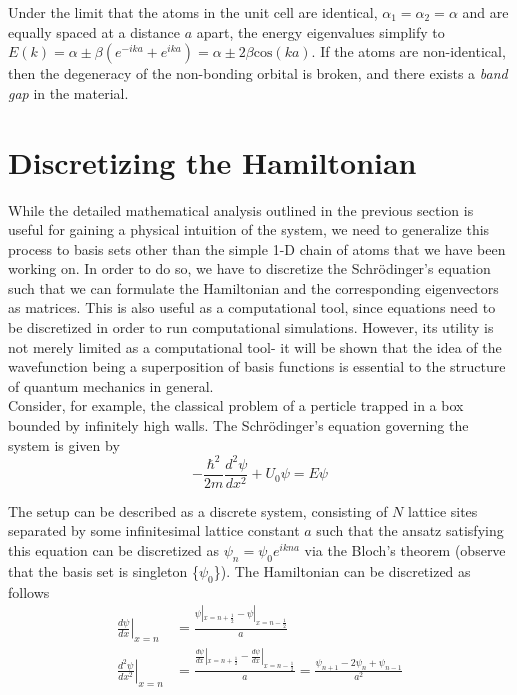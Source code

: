 Under the limit that the atoms in the unit cell are identical, $\alpha_{1} = \alpha_{2} = \alpha$ and are equally spaced at a distance $a$ apart, the energy eigenvalues simplify to $E(k) = \alpha \pm \beta (e^{-ika}+e^{ika}) = \alpha \pm 2\beta \text{cos}(ka)$. If the atoms are non-identical, then the degeneracy of the non-bonding orbital is broken, and there exists a \textit{band gap} in the material. 


\section{Discretizing the Hamiltonian}

While the detailed mathematical analysis outlined in the previous section is useful for gaining a physical intuition of the system, we need to generalize this process to basis sets other than the simple 1-D chain of atoms that we have been working on. In order to do so, we have to discretize the Schrödinger's equation such that we can formulate the Hamiltonian and the corresponding eigenvectors as matrices. This is also useful as a computational tool, since equations need to be discretized in order to run computational simulations. However, its utility is not merely limited as a computational tool- it will be shown that the idea of the wavefunction being a superposition of basis functions is essential to the structure of quantum mechanics in general. \\

Consider, for example, the classical problem of a perticle trapped in a box bounded by infinitely high walls. The Schrödinger's equation governing the system is given by
\begin{equation*}
    -\frac{\hbar^2}{2m}\frac{d^2 \psi}{dx^2} + U_0 \psi = E \psi
\end{equation*} 

The setup can be described as a discrete system, consisting of $N$ lattice sites separated by some infinitesimal lattice constant $a$ such that the ansatz satisfying this equation can be discretized as $\psi_{n} = \psi_{0}e^{ikna}$ via the Bloch's theorem (observe that the basis set is singleton \{$\psi_0$\}). The Hamiltonian can be discretized as follows
\begin{equation*}
\begin{aligned}
    \left.\frac{d\psi}{dx}\right|_{x=n} &= \frac{\psi|_{x=n+\frac{1}{2}}-\psi|_{x=n-\frac{1}{2}}}{a} \\
    \left.\frac{d^2 \psi}{dx^2}\right|_{x=n} &= \frac{\frac{d\psi}{dx}|_{x=n+\frac{1}{2}}-\frac{d\psi}{dx}|_{x=n-\frac{1}{2}}}{a} = \frac{\psi_{n+1}-2\psi_{n}+\psi_{n-1}}{a^2}
\end{aligned}
\end{equation*}

